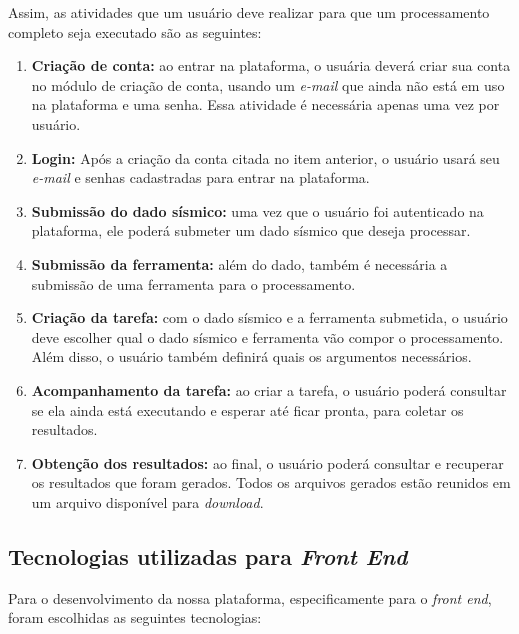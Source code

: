 \documentclass[11pt,twoside]{article}
\begin{document}
Assim, as atividades que um usuário deve realizar para que um processamento completo seja executado são as seguintes:
\begin{enumerate}
  \item \textbf{Criação de conta:} ao entrar na plataforma, o usuária deverá criar sua conta no módulo de criação de conta, usando um \emph{e-mail} que ainda não está em uso
  na plataforma e uma senha. Essa atividade é necessária apenas uma vez por usuário.
  \item \textbf{Login:} Após a criação da conta citada no item anterior, o usuário usará seu \emph{e-mail} e senhas cadastradas para entrar na plataforma.
  \item \textbf{Submissão do dado sísmico:} uma vez que o usuário foi autenticado na plataforma, ele poderá submeter um dado sísmico que deseja processar. 
  \item \textbf{Submissão da ferramenta:} além do dado, também é necessária a submissão de uma ferramenta para o processamento.
  \item \textbf{Criação da tarefa:} com o dado sísmico e a ferramenta submetida, o usuário deve escolher qual o dado sísmico e ferramenta vão compor o processamento.
  Além disso, o usuário também definirá quais os argumentos necessários.
  \item \textbf{Acompanhamento da tarefa:} ao criar a tarefa, o usuário poderá consultar se ela ainda está executando e esperar até ficar pronta, para coletar os resultados.
  \item \textbf{Obtenção dos resultados:} ao final, o usuário poderá consultar e recuperar os resultados que foram gerados. Todos os arquivos gerados estão reunidos em um arquivo
  disponível para \emph{download}. 
\end{enumerate}

\subsection{Tecnologias utilizadas para \emph{Front End}}

Para o desenvolvimento da nossa plataforma, especificamente para o \emph{front end}, foram escolhidas as seguintes tecnologias:
\end{document}
